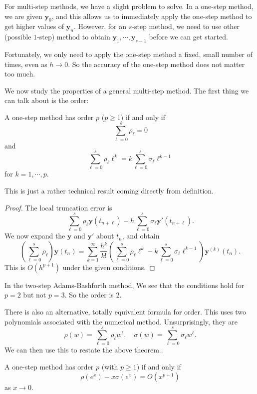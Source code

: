 \documentclass[a4paper]{article}
\begin{document}
For multi-step methods, we have a slight problem to solve. In a one-step method, we are given $\mathbf{y}_0$, and this allows us to immediately apply the one-step method to get higher values of $\mathbf{y}_n$. However, for an $s$-step method, we need to use other (possible $1$-step) method to obtain $\mathbf{y}_1, \cdots, \mathbf{y}_{s - 1}$ before we can get started.

Fortunately, we only need to apply the one-step method a fixed, small number of times, even as $h \to 0$. So the accuracy of the one-step method does not matter too much.

We now study the properties of a general multi-step method. The first thing we can talk about is the order:
\begin{thm}
  A one-step method has order $p$ ($p \geq 1$) if and only if
  \[
    \sum_{\ell = 0}^s \rho_\ell = 0
  \]
  and
  \[
    \sum_{\ell = 0}^s \rho_\ell \ell^k = k\sum_{\ell = 0}^s \sigma_\ell \ell^{k - 1}
  \]
  for $k = 1, \cdots, p$.
\end{thm}

This is just a rather technical result coming directly from definition.
\begin{proof}
  The local truncation error is
  \[
    \sum_{\ell = 0}^s \rho_\ell \mathbf{y}(t_{n + \ell}) - h \sum_{\ell = 0}^s \sigma_\ell \mathbf{y}'(t_{n + \ell}).
  \]
  We now expand the $\mathbf{y}$ and $\mathbf{y}'$ about $t_n$, and obtain
  \[
    \left(\sum_{\ell = 0}^s \rho_\ell\right) \mathbf{y}(t_n) = \sum_{k = 1}^\infty \frac{h^k}{k!}\left(\sum_{\ell = 0}^s \rho_\ell \ell^k - k \sum_{\ell = 0}^s \sigma_\ell \ell^{k - 1}\right)\mathbf{y}^{(k)}(t_n).
  \]
  This is $O(h^{p + 1})$ under the given conditions.
\end{proof}

\begin{eg}[AB2]
  In the two-step Adams-Bashforth method, We see that the conditions hold for $p = 2$ but not $p = 3$. So the order is $2$.
\end{eg}

There is also an alternative, totally equivalent formula for order. This uses two polynomials associated with the numerical method. Unsurprisingly, they are
\[
  \rho(w) = \sum_{\ell = 0}^s \rho_\ell w^\ell,\quad \sigma(w) = \sum_{\ell = 0}^s \sigma_\ell w^\ell.
\]
We can then use this to restate the above theorem..
\begin{thm}
  A one-step method has order $p$ (with $p \geq 1$) if and only if
  \[
    \rho(e^x) - x \sigma(e^x) = O(x^{p + 1})
  \]
  as $x \to 0$.
\end{thm}
\end{document}
